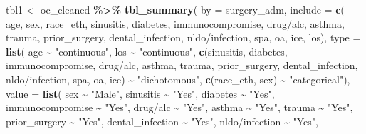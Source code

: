 \documentclass[
]{article}
\newenvironment{Shaded}{\begin{snugshade}}{\end{snugshade}}
\newcommand{\AttributeTok}[1]{\textcolor[rgb]{0.13,0.29,0.53}{#1}}
\newcommand{\FunctionTok}[1]{\textcolor[rgb]{0.13,0.29,0.53}{\textbf{#1}}}
\newcommand{\NormalTok}[1]{#1}
\newcommand{\OtherTok}[1]{\textcolor[rgb]{0.56,0.35,0.01}{#1}}
\newcommand{\SpecialCharTok}[1]{\textcolor[rgb]{0.81,0.36,0.00}{\textbf{#1}}}
\newcommand{\StringTok}[1]{\textcolor[rgb]{0.31,0.60,0.02}{#1}}
\begin{document}
\begin{Shaded}
\begin{Highlighting}[]
\NormalTok{tbl1 }\OtherTok{\textless{}{-}}\NormalTok{ oc\_cleaned }\SpecialCharTok{\%\textgreater{}\%}
  \FunctionTok{tbl\_summary}\NormalTok{(}
    \AttributeTok{by =}\NormalTok{ surgery\_adm,}
    \AttributeTok{include =} \FunctionTok{c}\NormalTok{(}
\NormalTok{      age, sex, race\_eth, sinusitis, diabetes, immunocompromise, }\StringTok{\textasciigrave{}}\AttributeTok{drug/alc}\StringTok{\textasciigrave{}}\NormalTok{,}
\NormalTok{      asthma, trauma, prior\_surgery, dental\_infection, }\StringTok{\textasciigrave{}}\AttributeTok{nldo/infection}\StringTok{\textasciigrave{}}\NormalTok{,}
\NormalTok{      spa, oa, ice, los),}
    \AttributeTok{type =} \FunctionTok{list}\NormalTok{(}
\NormalTok{      age }\SpecialCharTok{\textasciitilde{}} \StringTok{"continuous"}\NormalTok{,}
\NormalTok{      los }\SpecialCharTok{\textasciitilde{}} \StringTok{"continuous"}\NormalTok{,}
      \FunctionTok{c}\NormalTok{(sinusitis, diabetes, immunocompromise, }\StringTok{\textasciigrave{}}\AttributeTok{drug/alc}\StringTok{\textasciigrave{}}\NormalTok{,}
\NormalTok{        asthma, trauma, prior\_surgery, dental\_infection,}
        \StringTok{\textasciigrave{}}\AttributeTok{nldo/infection}\StringTok{\textasciigrave{}}\NormalTok{, spa, oa, ice) }\SpecialCharTok{\textasciitilde{}} \StringTok{"dichotomous"}\NormalTok{,}
      \FunctionTok{c}\NormalTok{(race\_eth, sex) }\SpecialCharTok{\textasciitilde{}} \StringTok{"categorical"}\NormalTok{),}
    \AttributeTok{value =} \FunctionTok{list}\NormalTok{(}
\NormalTok{      sex }\SpecialCharTok{\textasciitilde{}} \StringTok{"Male"}\NormalTok{,}
\NormalTok{      sinusitis }\SpecialCharTok{\textasciitilde{}} \StringTok{"Yes"}\NormalTok{,}
\NormalTok{      diabetes }\SpecialCharTok{\textasciitilde{}} \StringTok{"Yes"}\NormalTok{,}
\NormalTok{      immunocompromise }\SpecialCharTok{\textasciitilde{}} \StringTok{"Yes"}\NormalTok{,}
      \StringTok{\textasciigrave{}}\AttributeTok{drug/alc}\StringTok{\textasciigrave{}} \SpecialCharTok{\textasciitilde{}} \StringTok{"Yes"}\NormalTok{,}
\NormalTok{      asthma }\SpecialCharTok{\textasciitilde{}} \StringTok{"Yes"}\NormalTok{,}
\NormalTok{      trauma }\SpecialCharTok{\textasciitilde{}} \StringTok{"Yes"}\NormalTok{,}
\NormalTok{      prior\_surgery }\SpecialCharTok{\textasciitilde{}} \StringTok{"Yes"}\NormalTok{,}
\NormalTok{      dental\_infection }\SpecialCharTok{\textasciitilde{}} \StringTok{"Yes"}\NormalTok{,}
      \StringTok{\textasciigrave{}}\AttributeTok{nldo/infection}\StringTok{\textasciigrave{}} \SpecialCharTok{\textasciitilde{}} \StringTok{"Yes"}\NormalTok{,}

\end{Highlighting}
\end{Shaded}
\end{document}
